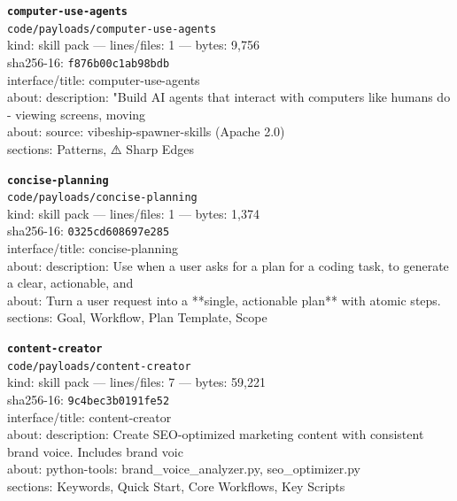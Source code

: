 \noindent\textbf{\texttt{computer-use-agents}}\\
\texttt{code/payloads/computer-use-agents}\\
kind: skill pack --- lines/files: 1 --- bytes: 9,756\\
sha256-16: \texttt{f876b00c1ab98bdb}\\
interface/title: computer-use-agents\\
about: description: "Build AI agents that interact with computers like humans do - viewing screens, moving \\
about: source: vibeship-spawner-skills (Apache 2.0)\\
sections: Patterns, ⚠️ Sharp Edges\\
\vspace*{6.0pt}
\newpage

\noindent\textbf{\texttt{concise-planning}}\\
\texttt{code/payloads/concise-planning}\\
kind: skill pack --- lines/files: 1 --- bytes: 1,374\\
sha256-16: \texttt{0325cd608697e285}\\
interface/title: concise-planning\\
about: description: Use when a user asks for a plan for a coding task, to generate a clear, actionable, and\\
about: Turn a user request into a **single, actionable plan** with atomic steps.\\
sections: Goal, Workflow, Plan Template, Scope\\
\vspace*{6.0pt}

\noindent\textbf{\texttt{content-creator}}\\
\texttt{code/payloads/content-creator}\\
kind: skill pack --- lines/files: 7 --- bytes: 59,221\\
sha256-16: \texttt{9c4bec3b0191fe52}\\
interface/title: content-creator\\
about: description: Create SEO-optimized marketing content with consistent brand voice. Includes brand voic\\
about: python-tools: brand\_voice\_analyzer.py, seo\_optimizer.py\\
sections: Keywords, Quick Start, Core Workflows, Key Scripts\\
\vspace*{6.0pt}

